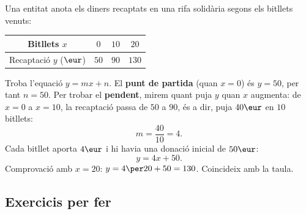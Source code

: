 \begin{exresolt}
Una entitat anota els diners recaptats en una rifa solidària segons els bitllets
venuts:
\begin{center}
\begin{tabular}{c c c c}
\toprule
Bitllets $x$ & $0$ & $10$ & $20$ \\
\midrule
Recaptació $y$ ($\eur$) & $50$ & $90$ & $130$ \\
\bottomrule
\end{tabular}
\end{center}
Troba l'equació $y=mx+n$.
\solucio
El \textbf{punt de partida} (quan $x=0$) és $y=50$, per tant $n=50$. Per trobar el
\textbf{pendent}, mirem quant puja $y$ quan $x$ augmenta: de $x=0$ a $x=10$, la
recaptació passa de $50$ a $90$, és a dir, puja $40\eur$ en $10$ bitllets:
\[
m=\frac{40}{10}=4.
\]
Cada bitllet aporta $4\eur$ i hi havia una donació inicial de $50\eur$:
\[
y=4x+50.
\]
Comprovació amb $x=20$: $y=4\per 20+50=130$. Coincideix amb la taula.
\end{exresolt}

\subsection{Exercicis per fer}


